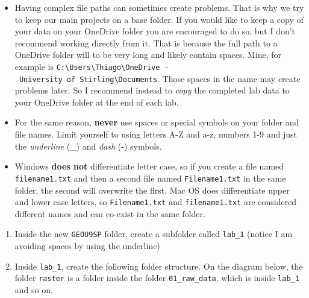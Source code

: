 \documentclass[
  letterpaper,
  DIV=11,
  numbers=noendperiod]{scrreprt}
\begin{document}
\begin{tcolorbox}[enhanced jigsaw, breakable, toptitle=1mm, colback=white, left=2mm, leftrule=.75mm, titlerule=0mm, colframe=quarto-callout-warning-color-frame, opacityback=0, title=\textcolor{quarto-callout-warning-color}{\faExclamationTriangle}\hspace{0.5em}{Warning}, toprule=.15mm, opacitybacktitle=0.6, bottomtitle=1mm, colbacktitle=quarto-callout-warning-color!10!white, bottomrule=.15mm, coltitle=black, rightrule=.15mm, arc=.35mm]

\begin{itemize}
\item
  Having complex file paths can sometimes create problems. That is why
  we try to keep our main projects on a base folder. If you would like
  to keep a copy of your data on your OneDrive folder you are encouraged
  to do so, but I don't recommend working directly from it. That is
  because the full path to a OneDrive folder will to be very long and
  likely contain spaces. Mine, for example is
  \texttt{C:\textbackslash{}Users\textbackslash{}Thiago\textbackslash{}OneDrive\ -\ University\ of\ Stirling\textbackslash{}Documents}.
  Those spaces in the name may create problems later. So I recommend
  instead to \emph{copy} the completed lab data to your OneDrive folder
  at the end of each lab.
\item
  For the same reason, \textbf{never} use spaces or special symbols on
  your folder and file names. Limit yourself to using letters A-Z and
  a-z, numbers 1-9 and just the \emph{underline} (\_) and \emph{dash}
  (-) symbols.
\item
  Windows \textbf{does not} differentiate letter case, so if you create
  a file named \texttt{filename1.txt} and then a second file named
  \texttt{Filename1.txt} in the same folder, the second will overwrite
  the first. Mac OS does differentiate upper and lower case letters, so
  \texttt{Filename1.txt} and \texttt{filename1.txt} are considered
  different names and can co-exist in the same folder.
\end{itemize}

\end{tcolorbox}

\begin{enumerate}
\def\labelenumi{(\arabic{enumi})}
\setcounter{enumi}{6}
\item
  Inside the new \texttt{GEOU9SP} folder, create a subfolder called
  \texttt{lab\_1} (notice I am avoiding spaces by using the underline)
\item
  Inside \texttt{lab\_1}, create the following folder structure. On the
  diagram below, the folder \texttt{raster} is a folder inside the
  folder \texttt{01\_raw\_data}, which is inside \texttt{lab\_1} and so
  on.
\end{enumerate}
\end{document}
